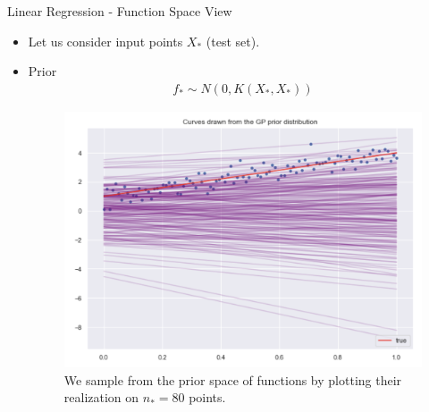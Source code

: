 \documentclass[10pt]{beamer}
\begin{document}
\begin{frame}{Linear Regression - Function Space View}{\cite[Chapter 2.2]{RW05}}
\begin{itemize}
\item Let us consider input points $X_*$ (test set).
\item Prior
\begin{align*}
f_* \sim N(0, K(X_*,X_* ))
\end{align*}
\begin{center}
\begin{figure}
\includegraphics[scale=0.2]{images/gp_lin_prior.png} 
\caption{We sample from the prior space of functions by plotting their realization on $n_*=80$ points. }
\end{figure}
\end{center}
\end{itemize}
\end{frame}
\end{document}
